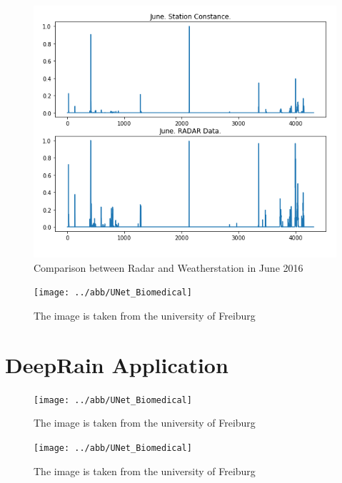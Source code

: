 \documentclass[oneside]{htwg-report}
\begin{document}
\begin{figure}[ht]
    \centering
    \includegraphics[width=1\linewidth,angle=0]{../abb/radar_station_daten_vergleich_June.png}
    \caption[Datenaufbereitung]{Comparison between Radar and Weatherstation in June 2016}
    \label{fig:radar_station_daten_vergleich_June}
\end{figure}

\begin{figure}[ht]
\centering
\texttt{[image: ../abb/UNet\_Biomedical]}
\caption{The image is taken from the university of Freiburg~\cite{ronneberger2015u}}
\end{figure}

\begin{sloppypar}
\noindent
\end{sloppypar}

\section*{DeepRain Application}

\begin{figure}[ht]
    \centering
    \texttt{[image: ../abb/UNet\_Biomedical]}
    \caption{The image is taken from the university of Freiburg~\cite{ronneberger2015u}}
\end{figure}


\begin{figure}[ht]
    \centering
    \texttt{[image: ../abb/UNet\_Biomedical]}
    \caption{The image is taken from the university of Freiburg~\cite{ronneberger2015u}}
\end{figure}
\end{document}
